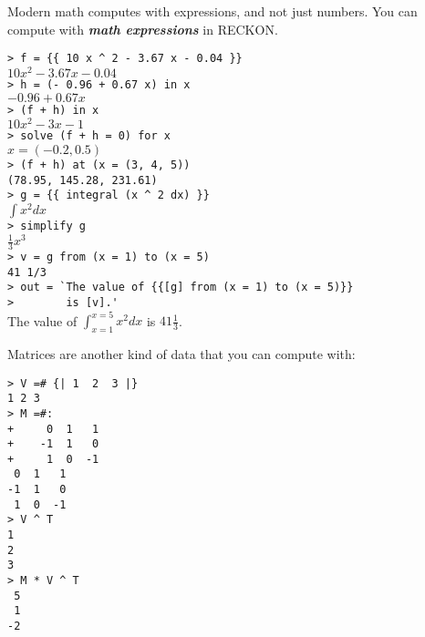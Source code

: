 \documentclass[12pt]{article}
\newcommand{\skey}[2]{{\bf \em #1#2}\index{#1}}
\newenvironment{indpar}[1][0.3in]%
	{\begin{list}{}%
		     {\setlength{\itemsep}{0in}%
		      \setlength{\topsep}{0in}%
		      \setlength{\parsep}{1ex}%
		      \setlength{\labelwidth}{#1}%
		      \setlength{\leftmargin}{#1}%
		      \addtolength{\leftmargin}{\labelsep}}%
	 \item}%
	{\end{list}}
\begin{document}
Modern math computes with expressions, and not just numbers.
You can compute with \skey{math expression}s in RECKON.

\begin{indpar}
\verb/> f = {{ 10 x ^ 2 - 3.67 x - 0.04 }}/ \\
$10x^2-3.67x-0.04$ \\
\verb/> h = (- 0.96 + 0.67 x) in x/ \\
$-0.96+0.67x$ \\
\verb/> (f + h) in x/ \\
$10x^2-3x-1$ \\
\verb/> solve (f + h = 0) for x/ \\
$x = (-0.2, 0.5)$ \\
\verb/> (f + h) at (x = (3, 4, 5))/ \\
\verb/(78.95, 145.28, 231.61)/ \\
\verb/> g = {{ integral (x ^ 2 dx) }}/ \\
$\int x^2 dx$ \\
\verb/> simplify g/ \\
$\frac{1}{3} x^3$ \\
\verb/> v = g from (x = 1) to (x = 5)/ \\
\verb:41 1/3: \\
\verb/> out = `The value of {{[g] from (x = 1) to (x = 5)}}/ \\
\verb/>        is [v].'/ \\
The value of $\int_{x = 1}^{x = 5} x^2 dx$ is $41\frac{1}{3}$.
\end{indpar}

Matrices are another kind of data that you can compute
with:

\begin{indpar}
\verb/> V =# {| 1  2  3 |}/ \\
\verb/1 2 3/ \\
\verb/> M =#:/ \\
\verb/+     0  1   1/ \\
\verb/+    -1  1   0/ \\
\verb/+     1  0  -1/ \\
\verb/ 0  1   1/ \\
\verb/-1  1   0/ \\
\verb/ 1  0  -1/ \\
\verb/> V ^ T/ \\
\verb/1/ \\
\verb/2/ \\
\verb/3/ \\
\verb/> M * V ^ T/ \\
\verb/ 5/ \\
\verb/ 1/ \\
\verb/-2/
\end{indpar}
\end{document}
